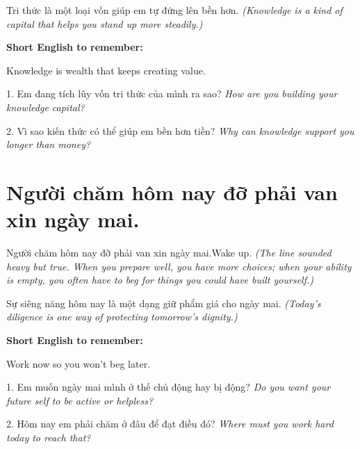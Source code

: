 \begin{baihoc}
Tri thức là một loại vốn giúp em tự đứng lên bền hơn.
\textit{(Knowledge is a kind of capital that helps you stand up more steadily.)}
\end{baihoc}

\begin{ghinhoanh}
\textbf{Short English to remember:}

Knowledge is wealth that keeps creating value.

\end{ghinhoanh}

\begin{tuhocnhanh}
1. Em đang tích lũy vốn tri thức của mình ra sao? \textit{How are you building your knowledge capital?}

2. Vì sao kiến thức có thể giúp em bền hơn tiền? \textit{Why can knowledge support you longer than money?}
\end{tuhocnhanh}
\ngancach

\section{Người chăm hôm nay đỡ phải van xin ngày mai.}
\begin{truyen}{Người chăm hôm nay đỡ phải van xin ngày mai.}{Wake up.}
\textit{(The line sounded heavy but true. When you prepare well, you have more choices; when your ability is empty, you often have to beg for things you could have built yourself.)}
\end{truyen}

\begin{baihoc}
Sự siêng năng hôm nay là một dạng giữ phẩm giá cho ngày mai.
\textit{(Today's diligence is one way of protecting tomorrow's dignity.)}
\end{baihoc}

\begin{ghinhoanh}
\textbf{Short English to remember:}

Work now so you won't beg later.

\end{ghinhoanh}

\begin{tuhocnhanh}
1. Em muốn ngày mai mình ở thế chủ động hay bị động? \textit{Do you want your future self to be active or helpless?}

2. Hôm nay em phải chăm ở đâu để đạt điều đó? \textit{Where must you work hard today to reach that?}
\end{tuhocnhanh}
\ngancach

